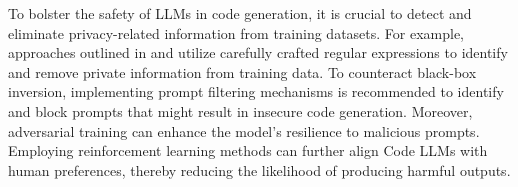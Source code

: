 To bolster the safety of LLMs in code generation, it is crucial to detect and eliminate privacy-related information from training datasets. 
For example, approaches outlined in \cite{fried2022incoder} and \cite{allal2023santacoder} utilize carefully crafted regular expressions to identify and remove private information from training data. 
To counteract black-box inversion, implementing prompt filtering mechanisms is recommended to identify and block prompts that might result in insecure code generation. 
Moreover, adversarial training can enhance the model's resilience to malicious prompts. Employing reinforcement learning methods can further align Code LLMs with human preferences, thereby reducing the likelihood of producing harmful outputs.

